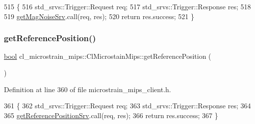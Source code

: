 \begin{DoxyCode}
515     \{
516         std\_srvs::Trigger::Request req;
517         std\_srvs::Trigger::Response res;
518 
519         \hyperlink{classcl__microstrain__mips_1_1ClMicrostainMips_a858136430bc226e36390517f28687a2a}{getMagNoiseSrv}.call(req, res);
520         \textcolor{keywordflow}{return} res.success;
521     \}
\end{DoxyCode}
\mbox{\label{classcl__microstrain__mips_1_1ClMicrostainMips_a1bb67145e871d3ce3637a713559a0121}} 
\subsubsection{\texorpdfstring{get\+Reference\+Position()}{getReferencePosition()}}
{\footnotesize\ttfamily \hyperlink{classbool}{bool} cl\+\_\+microstrain\+\_\+mips\+::\+Cl\+Microstain\+Mips\+::get\+Reference\+Position (\begin{DoxyParamCaption}{ }\end{DoxyParamCaption})\hspace{0.3cm}{\ttfamily [inline]}}



Definition at line 360 of file microstrain\+\_\+mips\+\_\+client.\+h.


\begin{DoxyCode}
361     \{
362         std\_srvs::Trigger::Request req;
363         std\_srvs::Trigger::Response res;
364 
365         \hyperlink{classcl__microstrain__mips_1_1ClMicrostainMips_a1f9b56f826c67a2e1d8a33e0879053bc}{getReferencePositionSrv}.call(req, res);
366         \textcolor{keywordflow}{return} res.success;
367     \}
\end{DoxyCode}
\mbox{\label{classcl__microstrain__mips_1_1ClMicrostainMips_acbb92f93e42a2c304d450cc30c0e992f}} 

